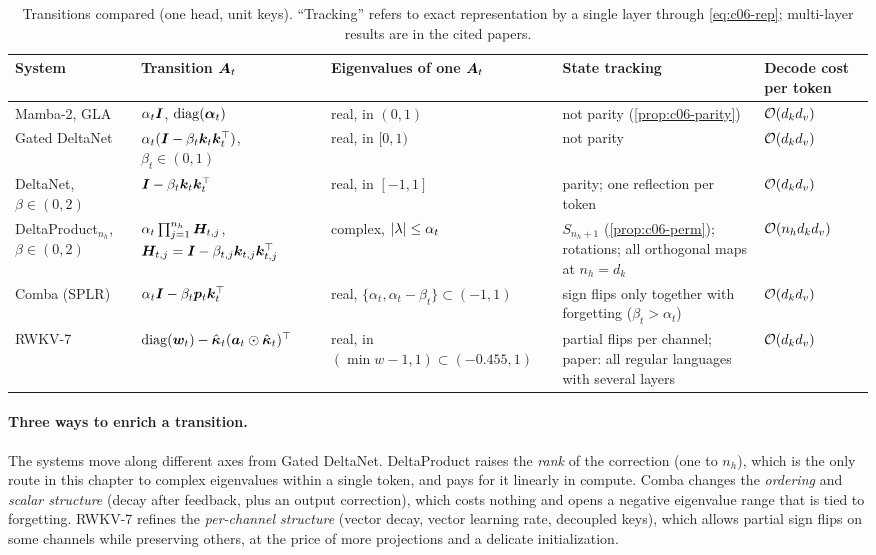 \begin{table}[t]
\centering\footnotesize
\caption{Transitions compared (one head, unit keys). ``Tracking'' refers to exact
representation by a single layer through \eqref{eq:c06-rep}; multi-layer results are in the
cited papers.}
\label{tab:c06-compare}
\begin{tabularx}{\textwidth}{@{}>{\raggedright\arraybackslash}p{2.1cm}>{\raggedright\arraybackslash}X>{\raggedright\arraybackslash}p{2.6cm}>{\raggedright\arraybackslash}X>{\raggedright\arraybackslash}p{1.9cm}@{}}
\toprule
System & Transition $\bm{A}_t$ & Eigenvalues of one $\bm{A}_t$ & State tracking & Decode cost per token \\
\midrule
Mamba-2, GLA & $\alpha_t\bm{I}$, $\operatorname{diag}(\bm{\alpha}_t)$ & real, in $(0,1)$ & not parity (\cref{prop:c06-parity}) & $\mathcal{O}(d_kd_v)$ \\
Gated DeltaNet & $\alpha_t(\bm{I}-\beta_t\bm{k}_t\bm{k}_t^{\top})$, $\beta_t\in(0,1)$ & real, in $[0,1)$ & not parity & $\mathcal{O}(d_kd_v)$ \\
DeltaNet, $\beta\in(0,2)$ & $\bm{I}-\beta_t\bm{k}_t\bm{k}_t^{\top}$ & real, in $[-1,1]$ & parity; one reflection per token & $\mathcal{O}(d_kd_v)$ \\
DeltaProduct$_{n_h}$, $\beta\in(0,2)$ & $\alpha_t\prod_{j=1}^{n_h}\bm{H}_{t,j}$, $\bm{H}_{t,j}=\bm{I}-\beta_{t,j}\bm{k}_{t,j}\bm{k}_{t,j}^{\top}$ & complex, $\left\lvert \lambda\right\rvert\le\alpha_t$ & $S_{n_h+1}$ (\cref{prop:c06-perm}); rotations; all orthogonal maps at $n_h=d_k$ & $\mathcal{O}(n_hd_kd_v)$ \\
Comba (SPLR) & $\alpha_t\bm{I}-\beta_t\bm{p}_t\bm{k}_t^{\top}$ & real, $\{\alpha_t,\alpha_t-\beta_t\}\subset(-1,1)$ & sign flips only together with forgetting ($\beta_t>\alpha_t$) & $\mathcal{O}(d_kd_v)$ \\
RWKV-7 & $\operatorname{diag}(\bm{w}_t)-\hat{\bm\kappa}_t(\bm{a}_t\odot\hat{\bm\kappa}_t)^{\top}$ & real, in $(\min w-1,1)\subset(-0.455,1)$ & partial flips per channel; paper: all regular languages with several layers & $\mathcal{O}(d_kd_v)$ \\
\bottomrule
\end{tabularx}
\end{table}

\paragraph{Three ways to enrich a transition.} The systems move along different axes from
Gated DeltaNet. DeltaProduct raises the \emph{rank} of the correction (one to $n_h$), which is
the only route in this chapter to complex eigenvalues within a single token, and pays for it
linearly in compute. Comba changes the \emph{ordering} and \emph{scalar structure} (decay
after feedback, plus an output correction), which costs nothing and opens a negative
eigenvalue range that is tied to forgetting. RWKV-7 refines the \emph{per-channel structure}
(vector decay, vector learning rate, decoupled keys), which allows partial sign flips on
some channels while preserving others, at the price of more projections and a delicate
initialization.

